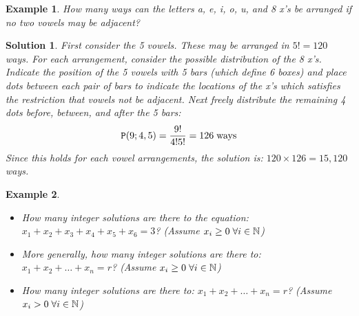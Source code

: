 \documentclass[12pt, letterpaper, onecolumn, conference, final]{IEEEtran}
\theoremstyle{definition}
\theoremstyle{plain}
\newtheorem{example}{Example}[section]
\newtheorem{solution}{Solution}[section]
\begin{document}
\begin{example}
How many ways can the letters a, e, i, o, u, and 8 x's be arranged if no two vowels may be adjacent?
\end{example}
\begin{solution}
First consider the 5 vowels. These may be arranged in $5!=120$ ways. For each arrangement, consider the possible distribution of the 8 x's. Indicate the position of the 5 vowels with 5 bars (which define 6 boxes) and place dots between each pair of bars to indicate the locations of the x's which satisfies the restriction that vowels not be adjacent. Next freely distribute the remaining 4 dots before, between, and after the 5 bars: 
\begin{equation*}
\mathtt{P}(9;4,5) = \frac{9!}{4!5!} = 126 \hspace{.1cm} \text{ways}
\end{equation*}
Since this holds for each vowel arrangements, the solution is: $120 \times 126 = 15,120$ ways.
\end{solution}

\begin{example}
\hfill
\begin{itemize}

\item[(a)]
How many integer solutions are there to the equation: $x_1 + x_2 + x_3 + x_4 + x_5 + x_6 = 3$? (Assume $x_i \geq 0 \hspace{.1cm} \forall i \in \mathbb{N}$)

\vspace{.2cm}
\item[(b)]
More generally, how many integer solutions are there to: $x_1 + x_2 + \dots + x_n = r$? (Assume $x_i \geq 0 \hspace{.1cm} \forall i \in \mathbb{N}$)

\vspace{.2cm}
\item[(c)]
How many integer solutions are there to: $x_1 + x_2 + \dots + x_n = r$? (Assume $x_i > 0 \hspace{.1cm} \forall i \in \mathbb{N}$)

\end{itemize}
\end{example}
\end{document}

